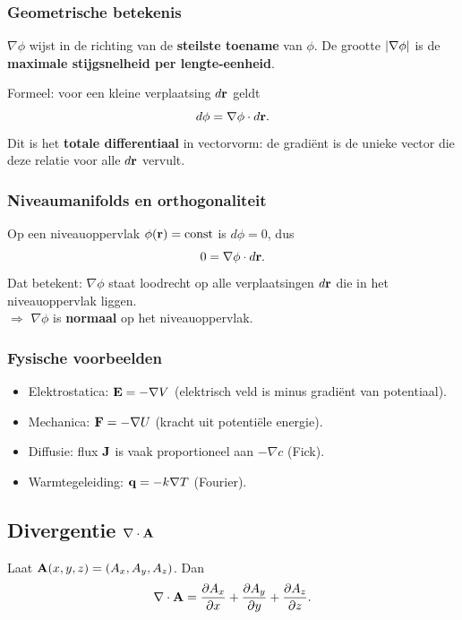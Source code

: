 \documentclass[11pt,a4paper]{article}
\begin{document}
    \subsubsection{Geometrische betekenis}
    \(\nabla \phi\) wijst in de richting van de \textbf{steilste toename} van \(\phi\).
    De grootte \(\abs{\nabla \phi}\) is de \textbf{maximale stijgsnelheid per lengte-eenheid}.

    Formeel: voor een kleine verplaatsing \(d\vb{r}\) geldt
    \begin{equation}
        d\phi = \nabla\phi \cdot d\vb{r}.
    \end{equation}
    Dit is het \textbf{totale differentiaal} in vectorvorm: de gradi\"ent is de unieke vector die deze relatie voor alle \(d\vb{r}\) vervult.

    \subsubsection{Niveaumanifolds en orthogonaliteit}
    Op een niveauoppervlak \(\phi(\vb{r})=\text{const}\) is \(d\phi=0\), dus
    \begin{equation}
        0 = \nabla\phi\cdot d\vb{r}.
    \end{equation}
    Dat betekent: \(\nabla\phi\) staat loodrecht op alle verplaatsingen \(d\vb{r}\) die in het niveauoppervlak liggen. \\
    \(\Rightarrow\) \(\nabla\phi\) is \textbf{normaal} op het niveauoppervlak.

    \subsubsection{Fysische voorbeelden}
    \begin{itemize}
        \item Elektrostatica: \(\vb{E} = -\nabla V\) (elektrisch veld is minus gradi\"ent van potentiaal).
        \item Mechanica: \(\vb{F} = -\nabla U\) (kracht uit potenti\"ele energie).
        \item Diffusie: flux \(\vb{J}\) is vaak proportioneel aan \(-\nabla c\) (Fick).
        \item Warmtegeleiding: \(\vb{q} = -k\nabla T\) (Fourier).
    \end{itemize}


    \subsection{Divergentie \texorpdfstring{$\nabla\cdot\vb{A}$}{∇·A}}
    Laat \(\vb{A}(x,y,z) = (A_x,A_y,A_z)\). Dan
    \begin{equation}
        \nabla\cdot\vb{A} = \pdv{A_x}{x}+\pdv{A_y}{y}+\pdv{A_z}{z}.
    \end{equation}
\end{document}

